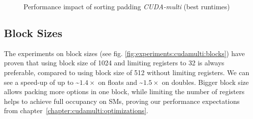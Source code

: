 \begin{figure}[H]
\begin{subfigure}{.49\textwidth}
\end{subfigure}
\begin{center}
  \small
\end{center}
\begin{center}
  \small
\end{center}
\caption{Performance impact of sorting padding \textit{CUDA-multi} (best runtimes)}
\label{fig:experiments:cudamulti:sorting}
\end{figure}

\newpage
\subsection{Block Sizes}
The experiments on block sizes (see fig. \ref{fig:experiments:cudamulti:blocks}) have proven that using block size of 1024 and limiting registers to 32 is always preferable, compared to using block size of 512 without limiting registers. We can see a speed-up of up to \textasciitilde$1.4\times$ on floats and \textasciitilde$1.5\times$ on doubles. Bigger block size allows packing more options in one block, while limiting the number of registers helps to achieve full occupancy on SMs, proving our performance expectations from chapter~\ref{chapter:cudamulti:optimizations}. 

